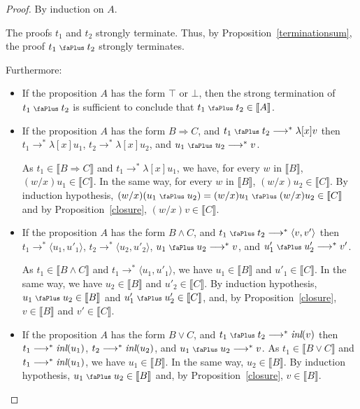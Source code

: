 \documentclass[screen, sigconf,authorversion,nonacm]{acmart}
\theoremstyle{acmdefinition}
\numberwithin{equation}{section}
\newcommand\abstr[1]{[#1]}
\newcommand\inl{\mbox{\it inl}}
\newcommand\plus{\mathrel{\text{\normalfont\scalebox{0.7}{\faPlus}}}}
\newcommand\pair[2]{\langle #1, #2 \rangle}
\newcommand\lra{\longrightarrow}
\begin{document}
\begin{proof}

  By induction on $A$.

  The proofs $t_1$ and $t_2$ strongly terminate.  Thus, by
  Proposition~\ref{terminationsum}, the proof $t_1 \plus t_2$ strongly
  terminates.

  Furthermore:
  \begin{itemize}
  \item If the proposition $A$ has the form $\top$ or $\bot$, then
    the strong termination of $t_1 \plus t_2$ is sufficient to conclude
    that $t_1 \plus t_2 \in \llbracket A \rrbracket$.
    
\item If the proposition $A$ has the form $B \Rightarrow C$, and $t_1
  \plus t_2 \lra^* \lambda \abstr{x} v$ then $t_1 \lra^* \lambda
  \abstr{x} u_1$, $t_2 \lra^* \lambda \abstr{x} u_2$, and $u_1 \plus
  u_2 \lra^* v$.

  As $t_1 \in \llbracket B \Rightarrow C \rrbracket$ and $t_1 \lra^*
  \lambda \abstr{x} u_1$, we have, for every $w$ in $\llbracket B
  \rrbracket$, $(w/x)u_1 \in \llbracket C \rrbracket$.  In the same
  way, for every $w$ in $\llbracket B \rrbracket$, $(w/x)u_2 \in
  \llbracket C \rrbracket$.  By induction hypothesis, $(w/x)(u_1 \plus
  u_2) = (w/x)u_1 \plus (w/x)u_2 \in \llbracket C \rrbracket$ and by
  Proposition~\ref{closure}, $(w/x)v \in \llbracket C \rrbracket$.

\item If the proposition $A$ has the form $B \wedge C$, and $t_1
  \plus t_2 \lra^* \pair{v}{v'}$ then
  $t_1 \lra^* \pair{u_1}{u'_1}$,
  $t_2 \lra^* \pair{u_2}{u'_2}$, $u_1 \plus u_2 \lra^* v$, and $u'_1
  \plus u'_2 \lra^* v'$.

  As $t_1 \in \llbracket B \wedge C \rrbracket$ and $t_1 \lra^*
  \pair{u_1}{u'_1}$, we have $u_1 \in \llbracket B \rrbracket$
  and $u'_1 \in \llbracket C \rrbracket$. In the same way, 
we have $u_2 \in \llbracket B \rrbracket$
  and $u'_2 \in \llbracket C \rrbracket$. 
  By induction hypothesis, $u_1 \plus u_2 \in \llbracket B \rrbracket$
and $u'_1 \plus u'_2 \in \llbracket C \rrbracket$, and, by
Proposition~\ref{closure}, $v \in \llbracket B \rrbracket$ and $v' \in
\llbracket C \rrbracket$.


\item If the proposition $A$ has the form $B \vee C$, and $t_1 \plus
  t_2 \lra^* \inl(v)$ then $t_1 \lra^* \inl(u_1)$, $t_2 \lra^*
  \inl(u_2)$, and $u_1 \plus u_2 \lra^* v$.  As $t_1 \in \llbracket B
  \vee C \rrbracket$ and $t_1 \lra^* \inl(u_1)$, we have $u_1 \in
  \llbracket B \rrbracket$. In the same way, $u_2 \in \llbracket B
  \rrbracket$.  By induction hypothesis, $u_1 \plus u_2 \in \llbracket
  B \rrbracket$ and, by Proposition~\ref{closure}, $v \in \llbracket B
  \rrbracket$.


\end{itemize}
\end{proof}
\end{document}
